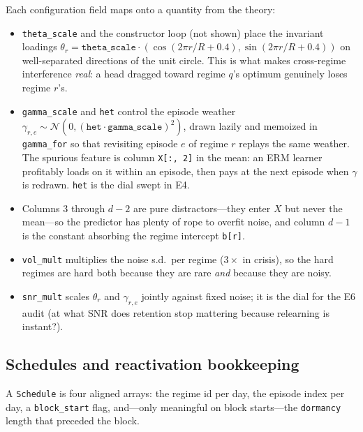 Each configuration field maps onto a quantity from the theory:
\begin{itemize}
  \item \texttt{theta\_scale} and the constructor loop (not shown) place the
        invariant loadings $\theta_r = \texttt{theta\_scale} \cdot
        (\cos(2\pi r/R + 0.4), \sin(2\pi r/R + 0.4))$ on well-separated
        directions of the unit circle. This is what makes cross-regime
        interference \emph{real}: a head dragged toward regime $q$'s optimum
        genuinely loses regime $r$'s.
  \item \texttt{gamma\_scale} and \texttt{het} control the episode weather
        $\gamma_{r,e} \sim \mathcal{N}(0, (\texttt{het} \cdot
        \texttt{gamma\_scale})^2)$, drawn lazily and memoized in
        \texttt{gamma\_for} so that revisiting episode $e$ of regime $r$
        replays the same weather. The spurious feature is column
        \texttt{X[:, 2]} in the mean: an ERM learner profitably loads on it
        within an episode, then pays at the next episode when $\gamma$ is
        redrawn. \texttt{het} is the dial swept in E4.
  \item Columns $3$ through $d-2$ are pure distractors---they enter $X$ but
        never the mean---so the predictor has plenty of rope to overfit
        noise, and column $d-1$ is the constant absorbing the regime
        intercept \texttt{b[r]}.
  \item \texttt{vol\_mult} multiplies the noise s.d.\ per regime
        ($3{\times}$ in crisis), so the hard regimes are hard both because
        they are rare \emph{and} because they are noisy.
  \item \texttt{snr\_mult} scales $\theta_r$ and $\gamma_{r,e}$ jointly
        against fixed noise; it is the dial for the E6 audit (at what SNR
        does retention stop mattering because relearning is instant?).
\end{itemize}

\subsection{Schedules and reactivation bookkeeping}
\label{sec:dd6-schedules}

A \texttt{Schedule} is four aligned arrays: the regime id per day, the
episode index per day, a \texttt{block\_start} flag, and---only meaningful
on block starts---the \texttt{dormancy} length that preceded the block.

